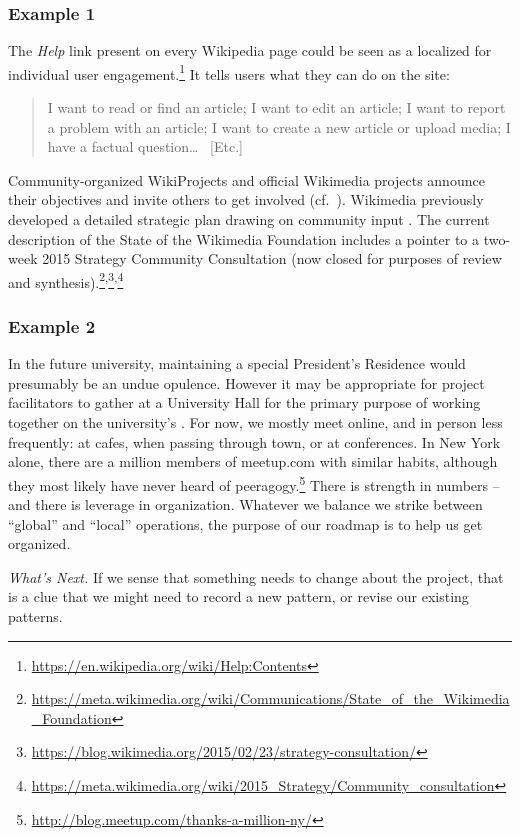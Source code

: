 \subsubsection*{Example 1}  The \emph{Help} link present on every Wikipedia page could be seen as a
localized  for individual user
engagement.\footnote{\url{https://en.wikipedia.org/wiki/Help:Contents}}
It tells users what they can do on the site:

\begin{quotation}
\noindent 
I want to read or find an article;
I want to edit an article;
I want to report a problem with an article;
I want to create a new article or upload media;
I have a factual question\ldots
~[Etc.]
\end{quotation}

Community-organized WikiProjects and official Wikimedia projects announce their objectives  and invite others to get involved (cf.~).  Wikimedia previously developed
a detailed strategic plan drawing on community input
\cite{wikimedia2011plan}.  The current description of the State of
the Wikimedia Foundation includes a pointer to a two-week 2015
Strategy Community Consultation (now closed for purposes of
review and synthesis).\footnote{\url{https://meta.wikimedia.org/wiki/Communications/State_of_the_Wikimedia_Foundation}}\textsuperscript{,}\footnote{\url{https://blog.wikimedia.org/2015/02/23/strategy-consultation/}}\textsuperscript{,}\footnote{\url{https://meta.wikimedia.org/wiki/2015_Strategy/Community_consultation}}

\subsubsection*{Example 2}
In the future university, maintaining a special President's Residence
would presumably be an undue opulence.  However it may be appropriate
for project facilitators to gather at a University Hall for the
primary purpose of working together on the university's
.  For now, we mostly meet online, and in person
less frequently: at cafes, when passing through town, or at
conferences.  In New York alone, there are a million members of
meetup.com with similar habits, although they most likely have never
heard of
peeragogy.\footnote{\url{http://blog.meetup.com/thanks-a-million-ny/}}
There is strength in numbers -- and there is leverage in organization.
Whatever we balance we strike between ``global'' and ``local''
operations, the purpose of our roadmap is to help us get organized.

\begin{framed}
\noindent
\emph{What's Next.}
If we sense that something needs to change about the project, that is a clue that we might need to record a new pattern, or revise our existing patterns.
\end{framed}
